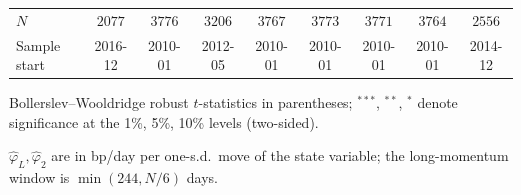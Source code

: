 \begin{table}[htbp]
\begin{threeparttable}
\begin{tabular}{lcccccccc}
$N$ & $2077$ & $3776$ & $3206$ & $3767$ & $3773$ & $3771$ & $3764$ & $2556$ \\
Sample start & \scriptsize 2016-12 & \scriptsize 2010-01 & \scriptsize 2012-05 & \scriptsize 2010-01 & \scriptsize 2010-01 & \scriptsize 2010-01 & \scriptsize 2010-01 & \scriptsize 2014-12 \\
\bottomrule
\end{tabular}
\begin{tablenotes}\scriptsize
\item Bollerslev--Wooldridge robust $t$-statistics in parentheses; $^{***}$, $^{**}$, $^{*}$ denote significance at the 1\%, 5\%, 10\% levels (two-sided).
\item $\hat\varphi_L,\hat\varphi_2$ are in bp/day per one-s.d.\ move of the state variable; the long-momentum window is $\min(244,N/6)$ days.
\end{tablenotes}\end{threeparttable}\end{table}

